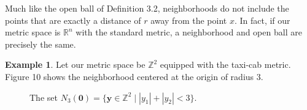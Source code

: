 \documentclass{article}
\newcommand{\R}{\mathbb{R}}
\newcommand{\y}{\mathbf{y}}
\newcommand{\Z}{\mathbb{Z}}
\theoremstyle{definition}
\newtheorem{example}{Example}[section]
\begin{document}
 Much like the open ball of Definition 3.2, neighborhoods do not include the points that are exactly a distance of $ r $ away from the point $ x $. In fact, if our metric space is $ \R^n $ with the standard metric, a neighborhood and open ball are precisely the same. 
\begin{example}
	Let our metric space be $ \Z^2 $ equipped with the taxi-cab metric. Figure 10 shows the neighborhood centered at the origin of radius 3. 
		\begin{figure}[h]
		\centering
		\caption{The set $ N_{3}(\mathbf{0})=\{\y\in\Z^2\mid|y_1|+|y_2|<3 \} $.}
	\end{figure}
\end{example} 
 
\end{document}

